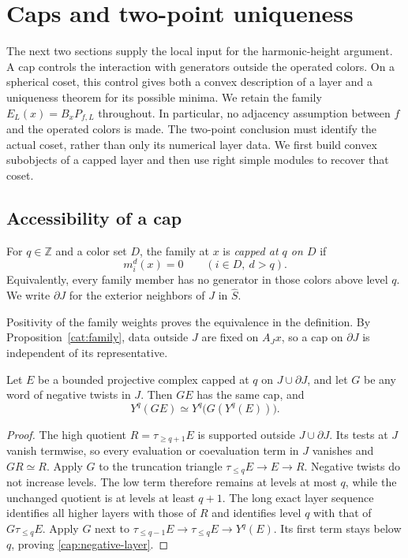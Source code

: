\section{Caps and two-point uniqueness}
\label{sec:caps}

The next two sections supply the local input for the harmonic-height
argument.  A cap controls the interaction with generators outside the
operated colors.  On a spherical coset, this control gives both a convex
description of a layer and a uniqueness theorem for its possible minima.
We retain the family $E_L(x)=B_xP_{f,L}$ throughout.  In particular, no
adjacency assumption between $f$ and the operated colors is made.
The two-point conclusion must identify the actual coset, rather than
only its numerical layer data.  We first build convex subobjects of a
capped layer and then use right simple modules to recover that coset.

\subsection{Accessibility of a cap}

\begin{definition}[Cap]
\label{cap:definition}
For $q\in\mathbb Z$ and a color set $D$, the family at $x$ is
\emph{capped at $q$ on $D$} if
\[
 m_i^d(x)=0\qquad(i\in D,\ d>q).
\]
Equivalently, every family member has no generator in those colors
above level $q$.  We write $\partial J$ for the exterior neighbors of
$J$ in $\widehat S$.
\end{definition}

Positivity of the family weights proves the equivalence in the
definition.  By Proposition~\ref{cat:family}, data outside $J$ are
fixed on $A_Jx$, so a cap on $\partial J$ is independent of its
representative.

\begin{lemma}
\label{cap:capped-negative}
Let $E$ be a bounded projective complex capped at $q$ on
$J\cup\partial J$, and let $G$ be any word of negative twists in $J$.
Then $GE$ has the same cap, and
\begin{equation}
 Y^q(GE)\simeq Y^q\bigl(G(Y^q(E))\bigr).
 \label{cap:negative-layer}
\end{equation}
\end{lemma}
\begin{proof}
The high quotient $R=\tau_{\ge q+1}E$ is supported outside
$J\cup\partial J$.  Its tests at $J$ vanish termwise, so every
evaluation or coevaluation term in $J$ vanishes and $GR\simeq R$.
Apply $G$ to the truncation triangle
$\tau_{\le q}E\to E\to R$.  Negative twists do not increase levels.
The low term therefore remains at levels at most $q$, while the
unchanged quotient is at levels at least $q+1$.  The long exact
layer sequence identifies all higher layers with those of $R$ and
identifies level $q$ with that of $G\tau_{\le q}E$.  Apply $G$ next
to $\tau_{\le q-1}E\to\tau_{\le q}E\to Y^q(E)$.
Its first term stays below $q$, proving \eqref{cap:negative-layer}.
\end{proof}

